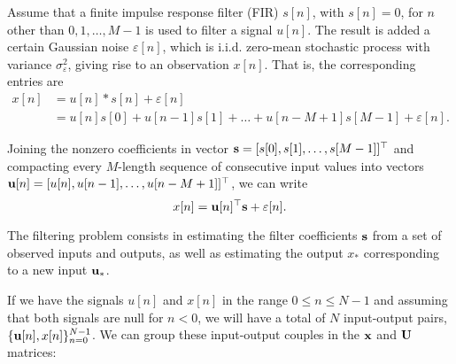 Assume that a finite impulse response filter (FIR) $s[n]$, with $s[n]=0$, for $n$ other than $0,1, \ldots, M-1$ is used to filter a signal $u[n]$. The result is added a certain Gaussian noise $\varepsilon[n]$, which is i.i.d. zero-mean stochastic process with variance $\sigma_\varepsilon^2 $, giving rise to an observation $x[n]$. That is, the corresponding entries are
\begin{align}
x[n] &= u[n]*s[n] + \varepsilon[n]\\
     & = u[n]s[0] + u[n-1]s[1] + \ldots + u[n-M+1]s[M-1] + \varepsilon[n].
\end{align}

Joining the nonzero coefficients in vector ${\mathbf s} = [s[0], s[1], \ldots, s[M-1]]^\top$ and compacting every $M$-length sequence of consecutive input values into vectors ${\mathbf u}[n] = [u[n], u[n-1], \ldots, u[n-M+1]]^\top$, we can write
\begin{equation}
\label{eq:signal_model}
x[n] = {\mathbf u}[n]^\top {\mathbf s}+  \varepsilon[n].
\end{equation}

The filtering problem consists in estimating the filter coefficients ${\mathbf s}$ from a set of observed inputs and outputs, as well as estimating the output $x_*$ corresponding to a new input ${\mathbf u}_*$.

If we have the signals $u[n]$ and $x[n]$ in the range $0\leq n \leq N-1$ and assuming that both signals are null for $n <0$, we will have a total of $N$ input-output pairs, $\{{\mathbf u}[n], x[n]\}_{n=0}^{N-1}$. We can group these input-output couples in the ${\mathbf x}$ and ${\mathbf U}$ matrices:

